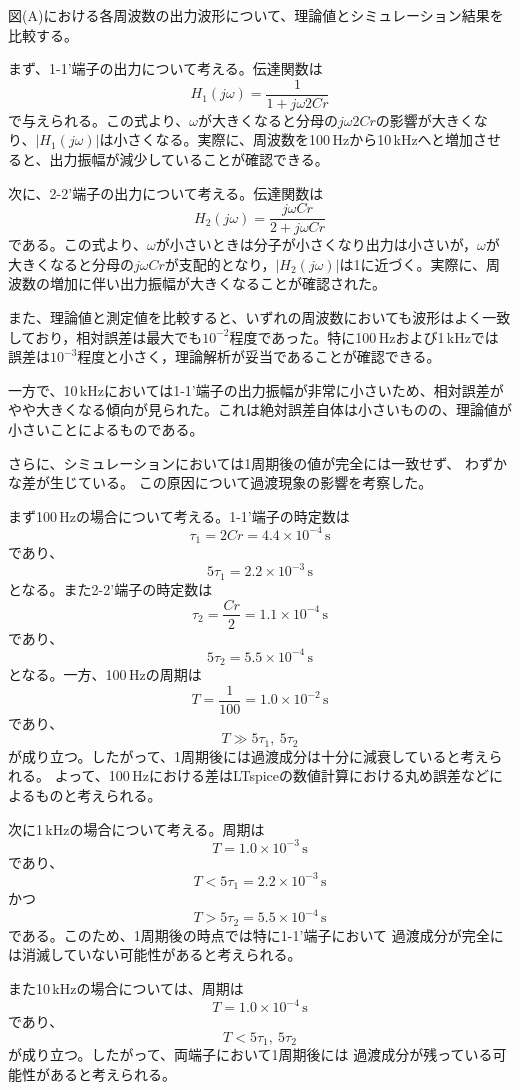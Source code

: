\documentclass[article]{jlreq}
\begin{document}
図(A)における各周波数の出力波形について、理論値とシミュレーション結果を比較する。

まず、1-1'端子の出力について考える。伝達関数は
\[
H_1(j\omega)=\frac{1}{1+j\omega 2Cr}
\]
で与えられる。この式より、$\omega$が大きくなると分母の$j\omega 2Cr$の影響が大きくなり、$|H_1(j\omega)|$は小さくなる。実際に、周波数を100\,Hzから10\,kHzへと増加させると、出力振幅が減少していることが確認できる。

次に、2-2'端子の出力について考える。伝達関数は
\[
H_2(j\omega)=\frac{j\omega Cr}{2+j\omega Cr}
\]
である。この式より、$\omega$が小さいときは分子が小さくなり出力は小さいが，$\omega$が大きくなると分母の$j\omega Cr$が支配的となり，$|H_2(j\omega)|$は1に近づく。実際に、周波数の増加に伴い出力振幅が大きくなることが確認された。

また、理論値と測定値を比較すると、いずれの周波数においても波形はよく一致しており，相対誤差は最大でも$10^{-2}$程度であった。特に100\,Hzおよび1\,kHzでは誤差は$10^{-3}$程度と小さく，理論解析が妥当であることが確認できる。

一方で、10\,kHzにおいては1-1'端子の出力振幅が非常に小さいため、相対誤差がやや大きくなる傾向が見られた。これは絶対誤差自体は小さいものの、理論値が小さいことによるものである。

さらに、シミュレーションにおいては1周期後の値が完全には一致せず、
わずかな差が生じている。
この原因について過渡現象の影響を考察した。

まず100\,Hzの場合について考える。1-1'端子の時定数は
\[
\tau_1=2Cr=4.4\times10^{-4}\,\mathrm{s}
\]
であり、
\[
5\tau_1=2.2\times10^{-3}\,\mathrm{s}
\]
となる。また2-2'端子の時定数は
\[
\tau_2=\frac{Cr}{2}=1.1\times10^{-4}\,\mathrm{s}
\]
であり、
\[
5\tau_2=5.5\times10^{-4}\,\mathrm{s}
\]
となる。一方、100\,Hzの周期は
\[
T=\frac{1}{100}=1.0\times10^{-2}\,\mathrm{s}
\]
であり、
\[
T \gg 5\tau_1,\ 5\tau_2
\]
が成り立つ。したがって、1周期後には過渡成分は十分に減衰していると考えられる。
よって、100\,Hzにおける差はLTspiceの数値計算における丸め誤差などによるものと考えられる。

次に1\,kHzの場合について考える。周期は
\[
T=1.0\times10^{-3}\,\mathrm{s}
\]
であり、
\[
T < 5\tau_1=2.2\times10^{-3}\,\mathrm{s}
\]
かつ
\[
T > 5\tau_2=5.5\times10^{-4}\,\mathrm{s}
\]
である。このため、1周期後の時点では特に1-1'端子において
過渡成分が完全には消滅していない可能性があると考えられる。

また10\,kHzの場合については、周期は
\[
T=1.0\times10^{-4}\,\mathrm{s}
\]
であり、
\[
T < 5\tau_1,\ 5\tau_2
\]
が成り立つ。したがって、両端子において1周期後には
過渡成分が残っている可能性があると考えられる。
\end{document}
